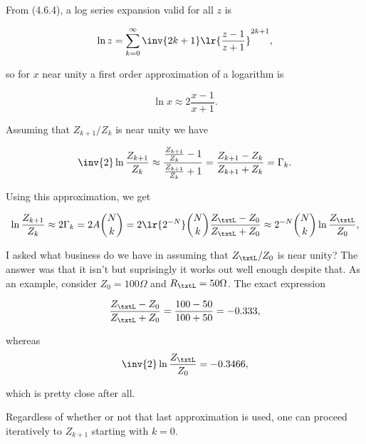 From \citep{NIST:DLMF} (4.6.4), a log series expansion valid for all \( z \) is

\begin{equation}\label{eqn:uwavesDeck7MultisectionTransformersCore:320}
\ln z = \sum_{k = 0}^\infty \inv{2 k + 1} \lr{ \frac{ z - 1 }{z + 1} }^{2k + 1},
\end{equation}

so for \( x \) near unity a first order approximation of a logarithm is

\begin{equation}\label{eqn:uwavesDeck7MultisectionTransformersCore:340}
\ln x \approx 2 \frac{x -1}{x+1}.
\end{equation}

Assuming that \( Z_{k+1}/Z_k \) is near unity we have

\begin{dmath}\label{eqn:uwavesDeck7MultisectionTransformersCore:360}
\inv{2} \ln \frac{Z_{k+1}}{Z_k} 
\approx
\frac{ \frac{Z_{k+1}}{Z_k} - 1 }{\frac{Z_{k+1}}{Z_k} + 1}
=
\frac{ Z_{k+1} - Z_k }{Z_{k+1} + Z_k}
=
\Gamma_k.
\end{dmath}

Using this approximation, we get

\begin{dmath}\label{eqn:uwavesDeck7MultisectionTransformersCore:380}
\ln \frac{Z_{k+1}}{Z_k}
\approx
2 \Gamma_k 
= 2 A \binom{N}{k}
= 2 \lr{2^{-N}} \binom{N}{k} \frac{Z_\txtL - Z_0}{Z_\txtL + Z_0}
\approx
2^{-N} \binom{N}{k} \ln \frac{Z_\txtL}{Z_0},
\end{dmath}

I asked what business do we have in assuming that \( Z_\txtL/Z_0 \) is near unity?  The answer was that it isn't but suprisingly it works out well enough despite that.  As an example, consider \( Z_0 = 100 \Omega \) and \( R_\txtL = 50 \Omega \).  The exact expression

\begin{dmath}\label{eqn:uwavesDeck7MultisectionTransformersCore:880}
\frac{Z_\txtL - Z_0}{Z_\txtL + Z_0} 
= \frac{100-50}{100+50} 
= -0.333,
\end{dmath}

whereas
\begin{dmath}\label{eqn:uwavesDeck7MultisectionTransformersCore:900}
\inv{2} \ln \frac{Z_\txtL}{Z_0} = -0.3466,
\end{dmath}

which is pretty close after all.

Regardless of whether or not that last approximation is used, one can proceed iteratively to \( Z_{k+1} \) starting with \( k = 0 \).

